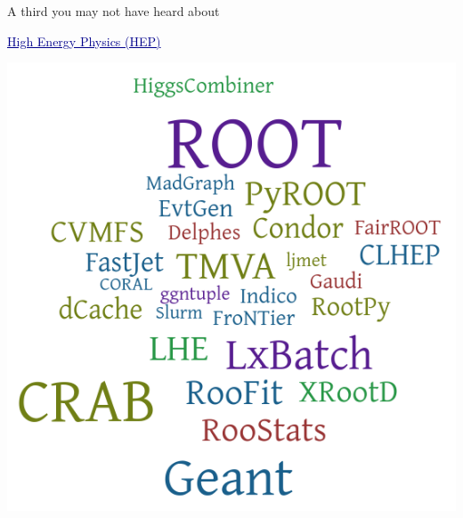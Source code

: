 \documentclass[aspectratio=169]{beamer}
\begin{document}
\begin{frame}{A third you may not have heard about}
\vspace{0.5 cm}
\begin{center}
\textcolor{darkblue}{\Large \underline{High Energy Physics (HEP)}}

\vspace{0.25 cm}
\includegraphics[height=6 cm]{hep-software.png}
\end{center}
\end{frame}
\end{document}
